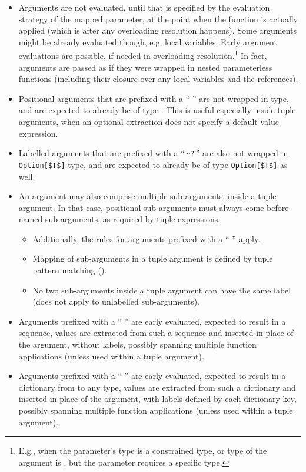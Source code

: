 \begin{itemize}
  \item Arguments are not evaluated, until that is specified by the evaluation strategy of the mapped parameter, at the point when the function is actually applied (which is after any overloading resolution happens). Some arguments might be already evaluated though, e.g. local variables. Early argument evaluations are possible, if needed in overloading resolution.\footnote{E.g., when the parameter's type is a constrained type, or type of the argument is , but the parameter requires a specific type.} In fact, arguments are passed as if they were wrapped in nested parameterless functions (including their closure over any local variables and the  references). 
  \item Positional arguments that are prefixed with a ``\,\,'' are not wrapped in  type, and are expected to already be of type . This is useful especially inside tuple arguments, when an optional extraction does not specify a default value expression. 
  \item Labelled arguments that are prefixed with a ``\,\lstinline!~?!\,'' are also not wrapped in \lstinline!Option[$T$]! type, and are expected to already be of type \lstinline!Option[$T$]! as well.
  \item An argument may also comprise multiple sub-arguments, inside a tuple argument. In that case, positional sub-arguments must always come before named sub-arguments, as required by tuple expressions. 
  \begin{itemize}
    \item Additionally, the rules for arguments prefixed with a ``\,\,'' apply. 
    \item Mapping of sub-arguments in a tuple argument is defined by tuple pattern matching (). 
    \item No two sub-arguments inside a tuple argument can have the same label (does not apply to unlabelled sub-arguments). 
  \end{itemize}
  \item Arguments prefixed with a ``\,\code{*}\,'' are early evaluated, expected to result in a sequence, values are extracted from such a sequence and inserted in place of the argument, without labels, possibly spanning multiple function applications (unless used within a tuple argument). 
  \item Arguments prefixed with a ``\,\code{**}\,'' are early evaluated, expected to result in a dictionary from  to any type, values are extracted from such a dictionary and inserted in place of the argument, with labels defined by each dictionary key, possibly spanning multiple function applications (unless used within a tuple argument). 

\end{itemize}
